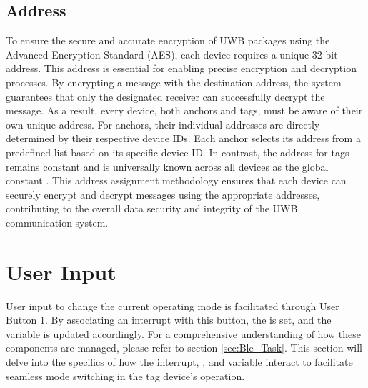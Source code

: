\subsection{Address}
To ensure the secure and accurate encryption of UWB packages using the Advanced Encryption Standard (AES), each device requires a unique 32-bit address. 
This address is essential for enabling precise encryption and decryption processes. 
By encrypting a message with the destination address, the system guarantees that only the designated receiver can successfully decrypt the message. 
As a result, every device, both anchors and tags, must be aware of their own unique address.
\vspace{4pt}
\newline
For anchors, their individual addresses are directly determined by their respective device IDs. 
Each anchor selects its address from a predefined list based on its specific device ID. 
In contrast, the address for tags remains constant and is universally known across all devices as the global constant . 
This address assignment methodology ensures that each device can securely encrypt and decrypt messages using the appropriate addresses, contributing to the overall data security and integrity of the UWB communication system.

\section{User Input}
User input to change the current operating mode is facilitated through User Button 1. 
By associating an interrupt with this button, the  is set, and the  variable is updated accordingly. 
For a comprehensive understanding of how these components are managed, please refer to section \ref{sec:Ble_Task}. 
This section will delve into the specifics of how the interrupt, , and  variable interact to facilitate seamless mode switching in the tag device's operation. 

